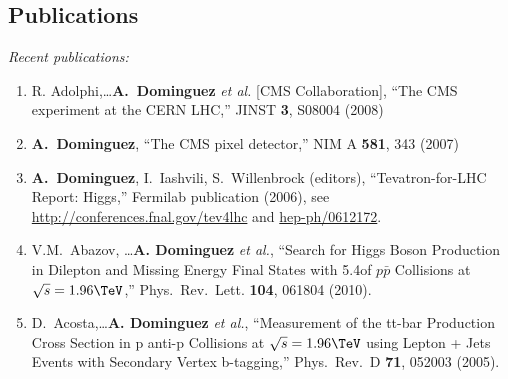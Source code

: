 \documentclass[11pt]{article}
\begin{document}
\subsection*{Publications}
\textit{Recent publications:}
\begin{enumerate}
\item R. Adolphi,\ldots\textbf{A.~Dominguez}  \textit{et al.} [CMS Collaboration], ``The CMS
  experiment at the CERN LHC,'' JINST \textbf{3}, S08004 (2008)
\item \textbf{A.~Dominguez}, ``The CMS pixel detector,'' NIM A
  \textbf{581}, 343 (2007)
\item \textbf{A.~Dominguez}, I.~Iashvili, S.~Willenbrock (editors),
  ``Tevatron-for-LHC Report: Higgs,'' Fermilab publication (2006), see
  \url{http://conferences.fnal.gov/tev4lhc} and \href{http://arxiv.org/abs/hep-ph/0612172}{hep-ph/0612172}.
\item V.M.~Abazov, \ldots\textbf{A. Dominguez} \textit{et al.},
  ``Search for Higgs Boson Production in Dilepton and Missing Energy
  Final States with 5.4\fb of $p\bar{p}$ Collisions at
  $\sqrt{s}=1.96\TeV$,'' Phys.\ Rev.\ Lett. \textbf{104}, 061804 (2010).
\item D.~Acosta,\ldots\textbf{A. Dominguez} \textit{et al.}, %
  ``Measurement of the tt-bar Production Cross Section in p anti-p
  Collisions at $\sqrt{s}=1.96\TeV$ using Lepton + Jets Events with
  Secondary Vertex b-tagging,'' Phys.\ Rev.\ D {\bf 71}, 052003 (2005).

\end{enumerate}




\end{document}
